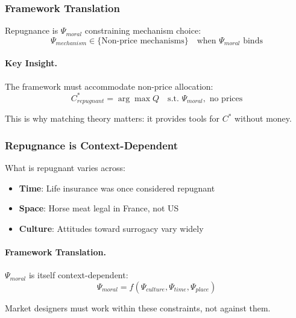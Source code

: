 \subsubsection{Framework Translation}

Repugnance is $\Psi_{moral}$ constraining mechanism choice:
\begin{equation}
\Psi_{mechanism} \in \{\text{Non-price mechanisms}\} \quad \text{when } \Psi_{moral} \text{ binds}
\end{equation}

\paragraph{Key Insight.}
The framework must accommodate non-price allocation:
\begin{equation}
C^*_{repugnant} = \arg\max Q \quad \text{s.t. } \Psi_{moral}, \text{ no prices}
\end{equation}

This is why matching theory matters: it provides tools for $C^*$ without money.

\subsubsection{Repugnance is Context-Dependent}

What is repugnant varies across:
\begin{itemize}
    \item \textbf{Time}: Life insurance was once considered repugnant
    \item \textbf{Space}: Horse meat legal in France, not US
    \item \textbf{Culture}: Attitudes toward surrogacy vary widely
\end{itemize}

\paragraph{Framework Translation.}
$\Psi_{moral}$ is itself context-dependent:
\begin{equation}
\Psi_{moral} = f(\Psi_{culture}, \Psi_{time}, \Psi_{place})
\end{equation}

Market designers must work within these constraints, not against them.

